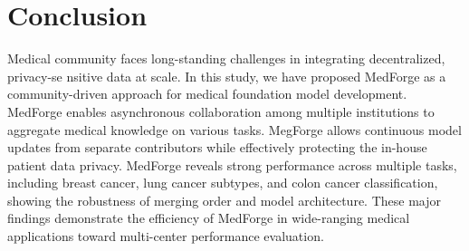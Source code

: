 \section{Conclusion}
Medical community faces long-standing challenges in integrating decentralized, privacy-se
nsitive data at scale. In this study, we have proposed MedForge as a community-driven approach for medical foundation model development. MedForge enables asynchronous collaboration among multiple institutions to aggregate medical knowledge on various tasks. MegForge allows continuous model updates from separate contributors while effectively protecting the in-house patient data privacy. MedForge reveals strong performance across multiple tasks, including breast cancer, lung cancer subtypes, and colon cancer classification, showing the robustness of merging order and model architecture. These major findings demonstrate the efficiency of MedForge in wide-ranging medical applications toward multi-center performance evaluation.


